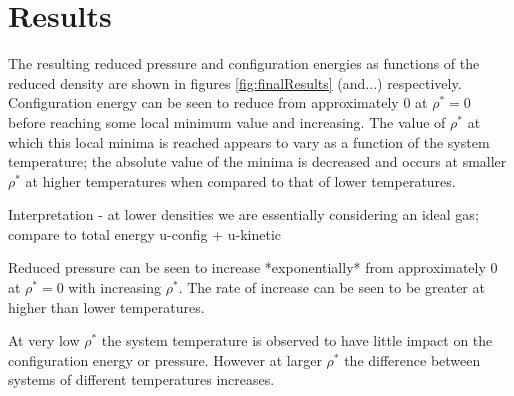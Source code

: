 \documentclass[10pt, twocolumn]{revtex4}    %
\begin{document}
\section{Results} \label{s:results}

The resulting reduced pressure and configuration energies as functions of the reduced density are shown in figures \ref{fig:finalResults} (and...) respectively. Configuration energy can be seen to reduce from approximately $0$ at $\rho{}^*=0$ before reaching some local minimum value and increasing. The value of $\rho{}^*$ at which this local minima is reached appears to vary as a function of the system temperature; the absolute value of the minima is decreased and occurs at smaller $\rho{}^*$ at higher temperatures when compared to that of lower temperatures.

Interpretation - at lower densities we are essentially considering an ideal gas; compare to total energy u-config + u-kinetic

Reduced pressure can be seen to increase *exponentially* from approximately $0$ at $\rho{}^*=0$ with increasing $\rho{}^*$. The rate of increase can be seen to be greater at higher than lower temperatures.


At very low $\rho{}^*$ the system temperature is observed to have little impact on the configuration energy or pressure. However at larger $\rho{}^*$ the difference between systems of different temperatures increases.
\end{document}

